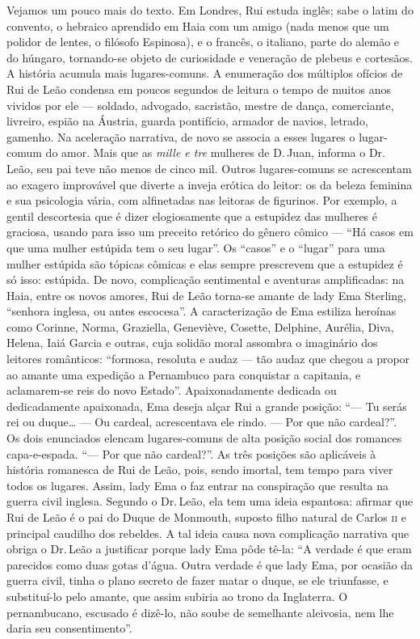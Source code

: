 Vejamos um pouco mais do texto. Em Londres, Rui estuda inglês; sabe o
latim do convento, o hebraico aprendido em Haia com um amigo (nada menos
que um polidor de lentes, o filósofo Espinosa), e o francês, o italiano,
parte do alemão e do húngaro, tornando-se objeto de curiosidade e
veneração de plebeus e cortesãos. A história acumula mais
lugares-comuns. A enumeração dos múltiplos ofícios de Rui de Leão
condensa em poucos segundos de leitura o tempo de muitos anos vividos
por ele --- soldado, advogado, sacristão, mestre de dança, comerciante,
livreiro, espião na Áustria, guarda pontifício, armador de navios,
letrado, gamenho. Na aceleração narrativa, de novo se associa a esses
lugares o lugar-comum do amor. Mais que as \emph{mille e tre} mulheres
de D.\,Juan, informa o Dr.\,Leão, seu pai teve não menos de cinco mil.
Outros lugares-comuns se acrescentam ao exagero improvável que diverte a
inveja erótica do leitor: os da beleza feminina e sua psicologia vária,
com alfinetadas nas leitoras de figurinos. Por exemplo, a gentil
descortesia que é dizer elogiosamente que a estupidez das mulheres é
graciosa, usando para isso um preceito retórico do gênero cômico --- ``Há
casos em que uma mulher estúpida tem o seu lugar''. Os ``casos'' e o ``lugar'' para uma mulher estúpida são tópicas cômicas e elas sempre prescrevem
que a estupidez é só isso: estúpida. De novo, complicação sentimental e
aventuras amplificadas: na Haia, entre os novos amores, Rui de Leão
torna-se amante de lady Ema Sterling, ``senhora inglesa, ou antes
escocesa''. A caracterização de Ema estiliza heroínas como Corinne,
Norma, Graziella, Geneviève, Cosette, Delphine, Aurélia, Diva, Helena,
Iaiá Garcia e outras, cuja solidão moral assombra o imaginário dos
leitores românticos: ``formosa, resoluta e audaz --- tão audaz que chegou
a propor ao amante uma expedição a Pernambuco para conquistar a
capitania, e aclamarem-se reis do novo Estado''. Apaixonadamente dedicada
ou dedicadamente apaixonada, Ema deseja alçar Rui a grande posição: ``--- Tu
serás rei ou duque\ldots{} --- Ou cardeal, acrescentava ele rindo. --- Por que
não cardeal?''. Os dois enunciados elencam lugares-comuns de alta posição
social dos romances capa-e-espada. ``--- Por que não cardeal?''. As três
posições são aplicáveis à história romanesca de Rui de Leão, pois, sendo
imortal, tem tempo para viver todos os lugares. Assim, lady Ema o faz
entrar na conspiração que resulta na guerra civil inglesa. Segundo o
Dr.\,Leão, ela tem uma ideia espantosa: afirmar que Rui de Leão é o pai do
Duque de Monmouth, suposto filho natural de Carlos \textsc{ii} e principal
caudilho dos rebeldes. A tal ideia causa nova complicação narrativa que
obriga o Dr.\,Leão a justificar porque lady Ema pôde tê-la: ``A verdade é
que eram parecidos como duas gotas d'água. Outra verdade é que lady Ema,
por ocasião da guerra civil, tinha o plano secreto de fazer matar o
duque, se ele triunfasse, e substituí-lo pelo amante, que assim subiria
ao trono da Inglaterra. O pernambucano, escusado é dizê-lo, não soube de
semelhante aleivosia, nem lhe daria seu consentimento''.

